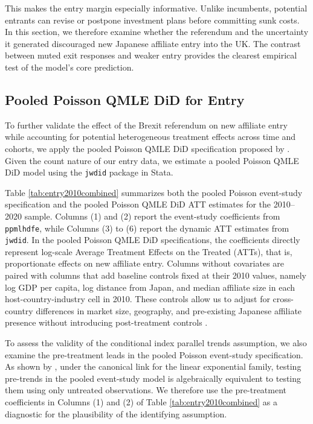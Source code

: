 \documentclass[preprint,11pt,authoryear]{elsarticle}
\begin{document}
This makes the entry margin especially informative. Unlike incumbents, potential entrants can revise or postpone investment plans before committing sunk costs. In this section, we therefore examine whether the referendum and the uncertainty it generated discouraged new Japanese affiliate entry into the UK. The contrast between muted exit responses and weaker entry provides the clearest empirical test of the model's core prediction.

\subsection{Pooled Poisson QMLE DiD for Entry} \label{sec:PQMLE-entry}

To further validate the effect of the Brexit referendum on new affiliate entry while accounting for potential heterogeneous treatment effects across time and cohorts, we apply the pooled Poisson QMLE DiD specification proposed by \cite{wooldridge2023simple}. Given the count nature of our entry data, we estimate a pooled Poisson QMLE DiD model using the \texttt{jwdid} package in Stata. 

Table \ref{tab:entry2010combined} summarizes both the pooled Poisson event-study specification and the pooled Poisson QMLE DiD ATT estimates for the 2010--2020 sample. Columns (1) and (2) report the event-study coefficients from \texttt{ppmlhdfe}, while Columns (3) to (6) report the dynamic ATT estimates from \texttt{jwdid}. In the pooled Poisson QMLE DiD specifications, the coefficients directly represent log-scale Average Treatment Effects on the Treated (ATTs), that is, proportionate effects on new affiliate entry. Columns without covariates are paired with columns that add baseline controls fixed at their 2010 values, namely log GDP per capita, log distance from Japan, and median affiliate size in each host-country-industry cell in 2010. These controls allow us to adjust for cross-country differences in market size, geography, and pre-existing Japanese affiliate presence without introducing post-treatment controls \citep{wooldridge2023simple}.

To assess the validity of the conditional index parallel trends assumption, we also examine the pre-treatment leads in the pooled Poisson event-study specification. As shown by \citet{wooldridge2023simple}, under the canonical link for the linear exponential family, testing pre-trends in the pooled event-study model is algebraically equivalent to testing them using only untreated observations. We therefore use the pre-treatment coefficients in Columns (1) and (2) of Table \ref{tab:entry2010combined} as a diagnostic for the plausibility of the identifying assumption.
\end{document}
